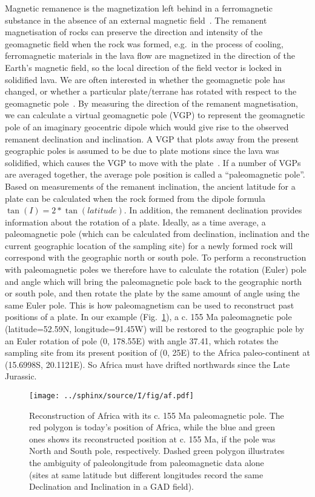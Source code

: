Magnetic remanence is the magnetization left behind in a ferromagnetic substance
in the absence of an external magnetic field~\cite{T19}. The remanent
magnetisation of rocks can preserve the direction and intensity of the
geomagnetic field when the rock was formed, e.g.\ in the process of cooling,
ferromagnetic materials in the lava flow are magnetized in the direction of the
Earth's magnetic field, so the local direction of the field vector is locked in
solidified lava. We are often interested in whether the geomagnetic pole has
changed, or whether a particular plate/terrane has rotated with respect to the
geomagnetic pole~\cite{T19}. By measuring the direction of the remanent
magnetisation, we can calculate a virtual geomagnetic pole (VGP) to represent
the geomagnetic pole of an imaginary geocentric dipole which would give rise to
the observed remanent declination and inclination. A VGP that plots away from
the present geographic poles is assumed to be due to plate motions since the
lava was solidified, which causes the VGP to move with the plate~\cite{T08}. If
a number of VGPs are averaged together, the average pole position is called a
``paleomagnetic pole''. Based on measurements of the remanent inclination, the
ancient latitude for a plate can be calculated when the rock formed from the
dipole formula $\tan(I) = 2 *\tan(latitude)$. In addition, the remanent
declination provides information about the rotation of a plate. Ideally, as a
time average, a paleomagnetic pole (which can be calculated from declination,
inclination and the current geographic location of the sampling site) for a
newly formed rock will correspond with the geographic north or south pole. To
perform a reconstruction with paleomagnetic poles we therefore have to calculate
the rotation (Euler) pole and angle which will bring the paleomagnetic pole back
to the geographic north or south pole, and then rotate the plate by the same
amount of angle using the same Euler pole. This is how paleomagnetism can be
used to reconstruct past positions of a plate. In our example
(Fig.~\ref{Fig:chap_intro_reconstructpole}), a c. 155 Ma paleomagnetic pole
(latitude=52.59\degree{}N, longitude=91.45\degree{}W) will be restored to the
geographic pole by an Euler rotation of pole (0\degree, 178.55\degree{}E) with
angle 37.41\degree, which rotates the sampling site from its present position of
(0\degree, 25\degree{}E) to the Africa paleo-continent at (15.6998\degree{}S,
20.1121\degree{}E). So Africa must have drifted northwards since the Late
Jurassic.

\begin{figure}
  \centering
    \texttt{[image: ../sphinx/source/I/fig/af.pdf]}
  \captionsetup{width=.95\textwidth}
  \caption{Reconstruction of Africa with its c. 155 Ma paleomagnetic pole. The
  red polygon is today's position of Africa, while the blue and green ones shows
  its reconstructed position at c. 155 Ma, if the pole was North and South pole,
  respectively. Dashed green polygon illustrates the ambiguity of paleolongitude
  from paleomagnetic data alone (sites at same latitude but different longitudes
  record the same Declination and Inclination in a GAD
  field).}\label{Fig:chap_intro_reconstructpole}
\end{figure}

